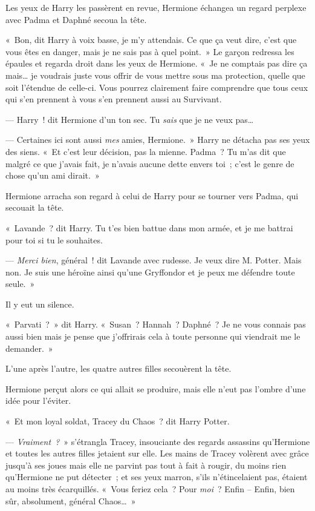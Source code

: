 Les yeux de Harry les passèrent en revue, Hermione échangea un regard perplexe avec Padma et Daphné secoua la tête.

«~Bon, dit Harry à voix basse, je m'y attendais. Ce que ça veut dire, c'est que vous êtes en danger, mais je ne sais pas à quel point.~» Le garçon redressa les épaules et regarda droit dans les yeux de Hermione. «~Je ne comptais pas dire ça mais… je voudrais juste vous offrir de vous mettre sous ma protection, quelle que soit l'étendue de celle-ci. Vous pourrez clairement faire comprendre que tous ceux qui s'en prennent à vous s'en prennent aussi au Survivant.

--- Harry~! dit Hermione d'un ton sec. Tu \emph{sais} que je ne veux pas…

--- Certaines ici sont aussi \emph{mes} amies, Hermione.~» Harry ne détacha pas ses yeux des siens. «~Et c'est leur décision, pas la mienne. Padma~? Tu m'as dit que malgré ce que j'avais fait, je n'avais aucune dette envers toi~; c'est le genre de chose qu'un ami dirait.~»

Hermione arracha son regard à celui de Harry pour se tourner vers Padma, qui secouait la tête.

«~Lavande~? dit Harry. Tu t'es bien battue dans mon armée, et je me battrai pour toi si tu le souhaites.

--- \emph{Merci bien}, général~! dit Lavande avec rudesse. Je veux dire M. Potter. Mais non. Je suis une héroïne ainsi qu'une Gryffondor et je peux me défendre toute seule.~»

Il y eut un silence.

«~Parvati~?~» dit Harry. «~Susan~? Hannah~? Daphné~? Je ne vous connais pas aussi bien mais je pense que j'offrirais cela à toute personne qui viendrait me le demander.~»

L'une après l'autre, les quatre autres filles secouèrent la tête.

Hermione perçut alors ce qui allait se produire, mais elle n'eut pas l'ombre d'une idée pour l'éviter.

«~Et mon loyal soldat, Tracey du Chaos~? dit Harry Potter.

--- \emph{Vraiment~?}~» s'étrangla Tracey, insouciante des regards assassins qu'Hermione et toutes les autres filles jetaient sur elle. Les mains de Tracey volèrent avec grâce jusqu'à ses joues mais elle ne parvint pas tout à fait à rougir, du moins rien qu'Hermione ne put détecter~; et ses yeux marron, s'ils n'étincelaient pas, étaient au moins très écarquillés. «~Vous feriez cela~? Pour \emph{moi}~? Enfin -- Enfin, bien sûr, absolument, général Chaos…~»

